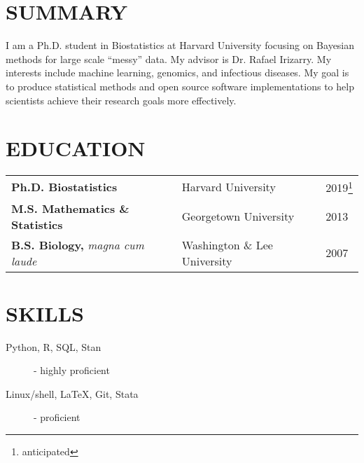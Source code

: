 \documentclass[line, margin]{res}
\begin{document}
\address{\url{ftownes@g.harvard.edu} \hspace{20 pt} \url{http://willtownes.github.io/}}
\begin{resume}
\thispagestyle{plain}

\section{SUMMARY}
I am a Ph.D. student in Biostatistics at Harvard University focusing on Bayesian methods for large scale ``messy'' data. My advisor is Dr. Rafael Irizarry. My interests include machine learning, genomics, and infectious diseases. My goal is to produce statistical methods and open source software implementations to help scientists achieve their research goals more effectively.

\section{EDUCATION}
\begin{savenotes}
\begin{tabular}{l l l}
\textbf{Ph.D. Biostatistics} & Harvard University & 2019\footnote{anticipated}\\
\textbf{M.S. Mathematics \& Statistics} & Georgetown University & 2013\\
\textbf{B.S. Biology,} \textit{magna cum laude} & Washington \& Lee University & 2007\\
\end{tabular}

\end{savenotes}

\section{SKILLS}
\begin{description}
\item[Python, R, SQL, Stan] - highly proficient
\item[Linux/shell, \LaTeX, Git, Stata] - proficient
\end{description}


\end{resume}
\end{document}
